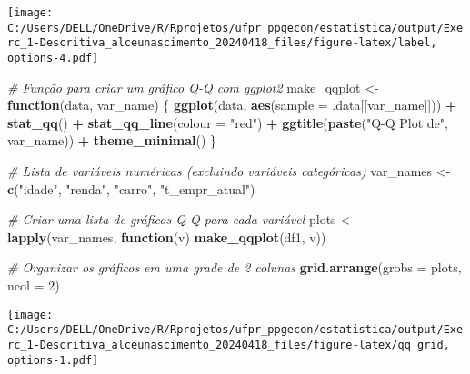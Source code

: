 \documentclass[
]{article}
\newenvironment{Shaded}{\begin{snugshade}}{\end{snugshade}}
\newcommand{\AttributeTok}[1]{\textcolor[rgb]{0.13,0.29,0.53}{#1}}
\newcommand{\CommentTok}[1]{\textcolor[rgb]{0.56,0.35,0.01}{\textit{#1}}}
\newcommand{\ControlFlowTok}[1]{\textcolor[rgb]{0.13,0.29,0.53}{\textbf{#1}}}
\newcommand{\DecValTok}[1]{\textcolor[rgb]{0.00,0.00,0.81}{#1}}
\newcommand{\FunctionTok}[1]{\textcolor[rgb]{0.13,0.29,0.53}{\textbf{#1}}}
\newcommand{\NormalTok}[1]{#1}
\newcommand{\OtherTok}[1]{\textcolor[rgb]{0.56,0.35,0.01}{#1}}
\newcommand{\SpecialCharTok}[1]{\textcolor[rgb]{0.81,0.36,0.00}{\textbf{#1}}}
\newcommand{\StringTok}[1]{\textcolor[rgb]{0.31,0.60,0.02}{#1}}
\begin{document}
\texttt{[image: C:/Users/DELL/OneDrive/R/Rprojetos/ufpr\_ppgecon/estatistica/output/Exerc\_1-Descritiva\_alceunascimento\_20240418\_files/figure-latex/label, options-4.pdf]}

\begin{Shaded}
\begin{Highlighting}[]
\CommentTok{\# Função para criar um gráfico Q{-}Q com ggplot2}
\NormalTok{make\_qqplot }\OtherTok{\textless{}{-}} \ControlFlowTok{function}\NormalTok{(data, var\_name) \{}
  \FunctionTok{ggplot}\NormalTok{(data, }\FunctionTok{aes}\NormalTok{(}\AttributeTok{sample =}\NormalTok{ .data[[var\_name]])) }\SpecialCharTok{+}
    \FunctionTok{stat\_qq}\NormalTok{() }\SpecialCharTok{+}
    \FunctionTok{stat\_qq\_line}\NormalTok{(}\AttributeTok{colour =} \StringTok{"red"}\NormalTok{) }\SpecialCharTok{+}
    \FunctionTok{ggtitle}\NormalTok{(}\FunctionTok{paste}\NormalTok{(}\StringTok{"Q{-}Q Plot de"}\NormalTok{, var\_name)) }\SpecialCharTok{+}
    \FunctionTok{theme\_minimal}\NormalTok{()}
\NormalTok{\}}

\CommentTok{\# Lista de variáveis numéricas (excluindo variáveis categóricas)}
\NormalTok{var\_names }\OtherTok{\textless{}{-}} \FunctionTok{c}\NormalTok{(}\StringTok{"idade"}\NormalTok{, }\StringTok{"renda"}\NormalTok{, }\StringTok{"carro"}\NormalTok{, }\StringTok{"t\_empr\_atual"}\NormalTok{)}

\CommentTok{\# Criar uma lista de gráficos Q{-}Q para cada variável}
\NormalTok{plots }\OtherTok{\textless{}{-}} \FunctionTok{lapply}\NormalTok{(var\_names, }\ControlFlowTok{function}\NormalTok{(v) }\FunctionTok{make\_qqplot}\NormalTok{(df1, v))}

\CommentTok{\# Organizar os gráficos em uma grade de 2 colunas}
\FunctionTok{grid.arrange}\NormalTok{(}\AttributeTok{grobs =}\NormalTok{ plots, }\AttributeTok{ncol =} \DecValTok{2}\NormalTok{)}
\end{Highlighting}
\end{Shaded}

\texttt{[image: C:/Users/DELL/OneDrive/R/Rprojetos/ufpr\_ppgecon/estatistica/output/Exerc\_1-Descritiva\_alceunascimento\_20240418\_files/figure-latex/qq grid, options-1.pdf]}
\end{document}
